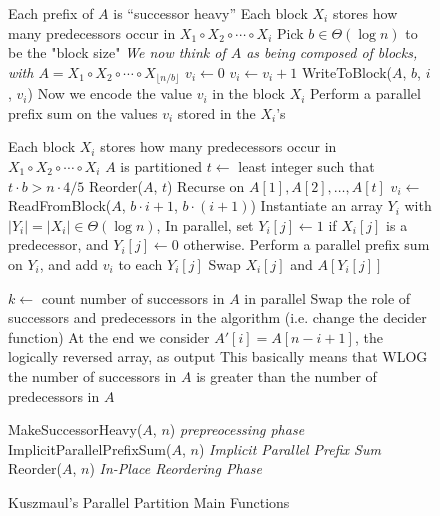 \documentclass[sigplan, 10pt, nonacm]{acmart}
\theoremstyle{remark}
\theoremstyle{remark}
\begin{document}
\begin{figure*}
  \caption{Kuszmaul's Parallel Partition Main Functions}
	\label{alg:parallelPartition}
  \begin{algorithmic} %
    \Require Each prefix of $A$ is ``successor heavy''
    \Ensure Each block $X_i$ stores how many predecessors occur in $X_1 \circ X_2 \circ \cdots \circ X_i$
      \State Pick $b \in \Theta(\log n)$ to be the "block size"
      \Comment \emph{We now think of $A$ as being composed of blocks, with $A = X_1 \circ X_2 \circ \cdots \circ X_{\lfloor n/b \rfloor}$}
        \State $v_i \gets 0$  
            \State $v_i \gets v_i + 1$
          \EndIf
        \EndFor
        \State WriteToBlock($A$, $b$, $i$, $v_i$)
        \Comment Now we encode the value $v_i$ in the block $X_i$
      \EndFor
      \State Perform a parallel prefix sum on the values $v_i$ stored in the $X_i$'s
   \EndProcedure
    \State

    \Require Each block $X_i$ stores how many predecessors occur in $X_1 \circ X_2 \circ \cdots \circ X_i$
    \Ensure $A$ is partitioned
      \State $t \gets $ least integer such that $t\cdot b > n\cdot 4/5$
      \State Reorder($A$, $t$)
      \Comment Recurse on $A[1], A[2], \ldots, A[t]$
      \State $v_i \gets$ ReadFromBlock($A$, $b\cdot i+1$, $b\cdot(i+1)$) 
        \State Instantiate an array $Y_i$ with $|Y_i| = |X_i| \in \Theta(\log n)$, 
        \State In parallel, set $Y_i[j] \gets 1$ if $X_i[j]$ is a predecessor, and $Y_i[j] \gets 0$ otherwise.
        \State Perform a parallel prefix sum on $Y_i$, and add $v_i$ to each $Y_i[j]$
            \State Swap $X_i[j]$ and $A[Y_i[j]]$
          \EndIf
        \EndFor
      \EndFor
    \EndProcedure
    \State

      \State $k \gets$ count number of successors in $A$ in parallel
        \State Swap the role of successors and predecessors in the algorithm (i.e. change the decider function)
        \State At the end we consider $A'[i] = A[n-i+1]$, the logically reversed array, as output
        \State This basically means that WLOG the number of successors in $A$ is greater than the number of predecessors in $A$
      \EndIf

      \State MakeSuccessorHeavy($A$, $n$) \Comment \emph{prepreocessing phase}
      \State ImplicitParallelPrefixSum($A$, $n$) \Comment \emph{Implicit Parallel Prefix Sum}
      \State Reorder($A$, $n$) \Comment \emph{In-Place Reordering Phase}
    \EndProcedure
	\end{algorithmic}	
\end{figure*}


\clearpage



\end{document}
